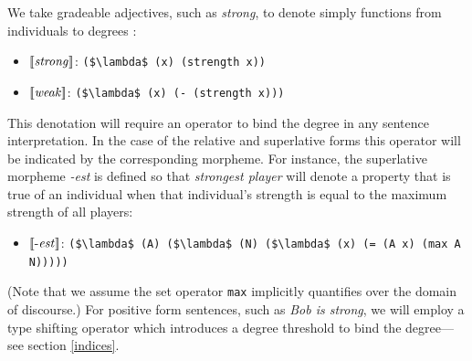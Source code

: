 \documentclass[pdfextras]{handbook}
\newcommand{\llbracket}{\ensuremath{\left [\!\left [}}%
\newcommand{\rrbracket}{\ensuremath{\right ]\!\right ]}}
\providecommand{\sv}[1]{\ensuremath{\llbracket \mathit{#1} \rrbracket}}
\begin{document}
We take gradeable adjectives, such as \emph{strong}, to denote simply functions from individuals to degrees \citep[e.g.][]{neeleman2004degree}:
\begin{itemize}
\item \sv{strong}: \lstinline[mathescape]{($\lambda$ (x) (strength x))}
\item \sv{weak}: \lstinline[mathescape]{($\lambda$ (x) (- (strength x)))}
\end{itemize}
This denotation will require an operator to bind the degree in any sentence interpretation. In the case of the relative and superlative forms this operator will be indicated by the corresponding morpheme.
For instance, the superlative morpheme \emph{-est} is defined so that \emph{strongest player} will denote a property that is true of an individual when that individual's strength is equal to the maximum strength of all players: 
\begin{itemize}
\item \sv{\text{-}est}: \lstinline[mathescape]{($\lambda$ (A) ($\lambda$ (N) ($\lambda$ (x) (= (A x) (max A N)))))}
\end{itemize}
(Note that we assume the set operator \lstinline{max} implicitly quantifies over the domain of discourse.)
For positive form sentences, such as \emph{Bob is strong}, we will employ a type shifting operator which introduces a degree threshold to bind the degree---see section \ref{indices}.





\end{document}
